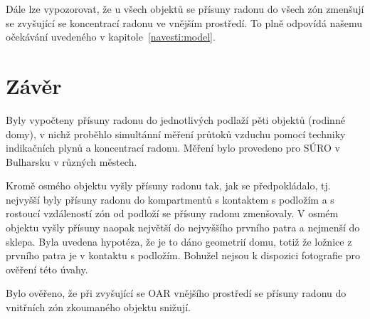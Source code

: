 Dále lze vypozorovat, že u všech objektů se přísuny radonu do všech zón zmenšují se zvyšující se koncentrací radonu ve vnějším prostředí. To plně odpovídá našemu očekávání uvedeného v kapitole~\ref{navesti:model}.
\section{Závěr}
Byly vypočteny přísuny radonu do jednotlivých podlaží pěti objektů (rodinné domy), v nichž proběhlo simultánní měření průtoků vzduchu pomocí techniky indikačních plynů a koncentrací radonu. Měření bylo provedeno pro SÚRO v Bulharsku v různých městech. 

Kromě osmého objektu vyšly přísuny radonu tak, jak se předpokládalo, tj. nejvyšší byly přísuny radonu do kompartmentů s kontaktem s podložím a s rostoucí vzdáleností zón od podloží se přísuny radonu zmenšovaly. V osmém objektu vyšly přísuny naopak největší do nejvyššího prvního patra a nejmenší do sklepa. Byla uvedena hypotéza, že je to dáno geometrií domu, totiž že ložnice z prvního patra je v kontaktu s podložím. Bohužel nejsou k dispozici fotografie pro ověření této úvahy.

Bylo ověřeno, že při zvyšující se OAR vnějšího prostředí se přísuny radonu do vnitřních zón zkoumaného objektu snižují.
